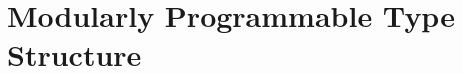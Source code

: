 \documentclass[12pt]{cmuthesis}
\begin{document}
\part{Modularly Programmable Type Structure}







\backmatter

\renewcommand{\bibsection}{\chapter{\bibname}}
\newcommand{\bibpreamble}{TODO: Explain abbreviations.}

\end{document}
